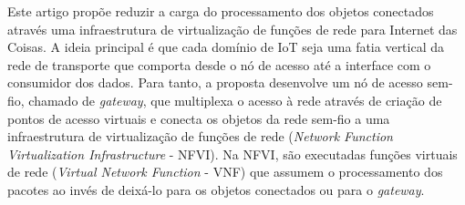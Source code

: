 \documentclass[12pt]{article}
\begin{document}

Este artigo propõe reduzir a carga do processamento dos objetos conectados através uma infraestrutura de virtualização de funções de rede para Internet das Coisas. A ideia principal é que cada domínio de IoT seja uma fatia vertical da rede de transporte que comporta desde o nó de acesso até a interface com o consumidor dos dados. Para tanto, a proposta desenvolve um nó de acesso sem-fio, chamado de \textit{gateway}, que multiplexa o acesso à rede através de criação de pontos de acesso virtuais e conecta os objetos da rede sem-fio a uma infraestrutura de virtualização de funções de rede (\textit{Network Function Virtualization Infrastructure} - NFVI). Na NFVI, são executadas funções virtuais de rede (\textit{Virtual Network Function} - VNF) que assumem o processamento dos pacotes ao invés de deixá-lo para os objetos conectados ou para o \textit{gateway}. %
\end{document}
